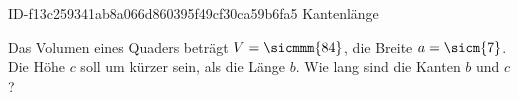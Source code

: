 \begin{exercise}
      {ID-f13c259341ab8a066d860395f49cf30ca59b6fa5}
      {Kantenlänge}
  \ifproblem\problem\par
    Das Volumen eines Quaders beträgt $V=\sicmmm{84}$, die Breite
    $a=\sicm{7}$. Die Höhe $c$ soll um  kürzer sein, als die Länge $b$.
    Wie lang sind die Kanten $b$ und $c$?
  \fi
\end{exercise}
